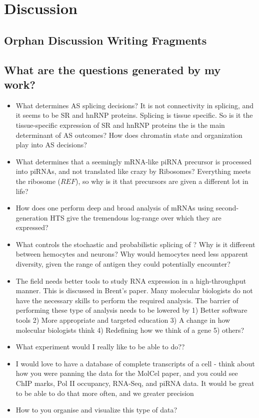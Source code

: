 \chapter{Discussion}   \label{Chapter 5} 
\section{Orphan Discussion Writing Fragments}

\section{What are the questions generated by my work?}

    \begin{itemize}
      \item What determines AS splicing decisions? It is not connectivity in splicing, and it seems to be SR and hnRNP proteins. Splicing is tissue specific. So is it the tissue-specific expression of SR and hnRNP proteins the is the main determinant of AS outcomes? How does chromatin state and organization play into AS decisions? 
      \item What determines that a seemingly mRNA-like piRNA precursor is processed into piRNAs, and not translated like crazy by Ribosomes?  Everything meets the ribosome ($REF$), so why is it that precursors are given a different lot in life?
      \item How does one perform deep and broad analysis of mRNAs using second-generation HTS give the tremendous log-range over which they are expressed?
      \item What controls the stochastic and probabilistic splicing of \dscam{}? Why is it different between hemocytes and neurons? Why would hemocytes need less apparent diversity, given the range of antigen they could potentially encounter?
      \item The field needs better tools to study RNA expression in a high-throughput manner. This is discussed in Brent's paper. Many molecular biologists do not have the necessary skills to perform the required analysis. The barrier of performing these type of analysis needs to be lowered by 1) Better software tools 2) More appropriate and targeted education 3) A change in how molecular biologists think 4) Redefining how we think of a gene 5) others?
      \item What experiment would I really like to be able to do??
      \item I would love to have a database of complete transcripts of a cell - think about how you were panning the data for the MolCel paper, and you could see ChIP marks, Pol II occupancy, RNA-Seq, and piRNA data. It would be great to be able to do that more often, and we greater precision
      \item How to you organise and visualize this type of data?
      \end{itemize}


